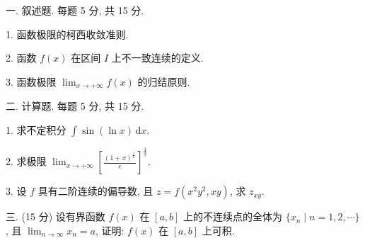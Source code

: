 \documentclass{examcollection}
\begin{document}
{\begin{minipage}{\textwidth}
\smallskip
一. 叙述题. 每题 5 分, 共 15 分.\par
1. 函数极限的柯西收敛准则.\par
2. 函数 $f(x)$ 在区间 $I$ 上不一致连续的定义.\par
3. 函数极限 $\lim_{x\to +\infty}f(x)$ 的归结原则.\par
二. 计算题. 每题 5 分, 共 15 分.\par
1. 求不定积分 $\int \sin (\ln x) \, \mathrm{d}x$.\par
2. 求极限 $\lim_{x\to +\infty}\left[\frac{(1 + x)^{\frac{1}{x}}}{e}\right]^{\frac{1}{x}}.$\par
3. 设 $f$ 具有二阶连续的偏导数, 且 $z = f(x^{2}y^{2}, xy)$, 求 $z_{xy}$.\par
三. (15 分) 设有界函数 $f(x)$ 在 $[a, b]$ 上的不连续点的全体为 $\{x_n \mid n = 1, 2, \cdots\}$, 且 $\lim_{n \to \infty} x_n = a$, 证明: $f(x)$ 在 $[a, b]$ 上可积.\par
\end{minipage}}
\ifdim\dimexpr\ht\proofbox+\dp\proofbox\relax>\textheight
\noindent\resizebox{!}{\textheight}{\usebox{\proofbox}}\else\noindent\usebox{\proofbox}\fi\clearpage
\end{document}
